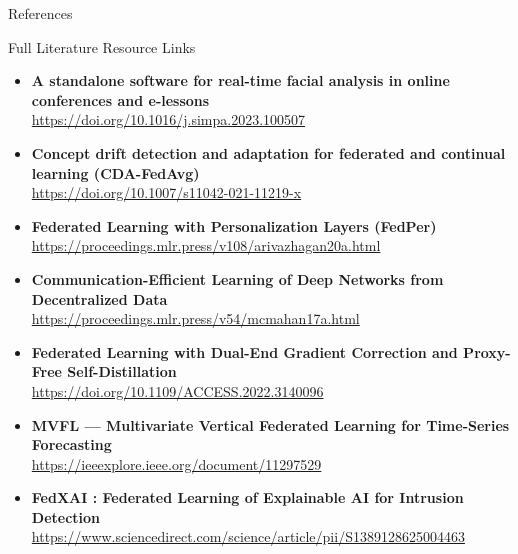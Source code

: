 \documentclass[aspectratio=169, 11pt]{beamer}
\begin{document}
\begin{frame}[allowframebreaks]{References}
    \tiny
    \nocite{churaev2023,jothimurugesan2022,arivazhagan2020,mcmahan2017,liu2022}
    \nocite{yang2025mvfl,kalakoti2025fedxai,noseda2025financial,karamanlioglu2025clinical,wang2025personalized}
    \nocite{abdelsater2024llama,maher2025automl,gupta2025privacy,yuan2024trend,tang2025horizon}
    \nocite{zhang2022multitask,larocca2021attention,amato2023clustering,larocca2022shap,bernardi2023adaptive}
    \nocite{dusing2025sepsis,qayyum2023fedsepsis,lei2025supervised,pan2025multiprog,maurya2025secure}
    
    
\end{frame}

\begin{frame}[allowframebreaks]{Full Literature Resource Links}
    \begin{itemize}
        \item \textbf{\small A standalone software for real-time facial analysis in online conferences and e-lessons} \\ \url{https://doi.org/10.1016/j.simpa.2023.100507}
        \item \textbf{\small Concept drift detection and adaptation for federated and continual learning (CDA-FedAvg)} \\ \url{https://doi.org/10.1007/s11042-021-11219-x}
        \item \textbf{\small Federated Learning with Personalization Layers (FedPer)} \\ \url{https://proceedings.mlr.press/v108/arivazhagan20a.html}
        \item \textbf{\small Communication-Efficient Learning of Deep Networks from Decentralized Data} \\ \url{https://proceedings.mlr.press/v54/mcmahan17a.html}
        \item \textbf{\small Federated Learning with Dual-End Gradient Correction and Proxy-Free Self-Distillation} \\ \url{https://doi.org/10.1109/ACCESS.2022.3140096}
        \item \textbf{\small MVFL — Multivariate Vertical Federated Learning for Time-Series Forecasting} \\ \url{https://ieeexplore.ieee.org/document/11297529}
        \item \textbf{\small FedXAI : Federated Learning of Explainable AI for Intrusion Detection} \\ \url{https://www.sciencedirect.com/science/article/pii/S1389128625004463}

\end{itemize}
\end{frame}
\end{document}
